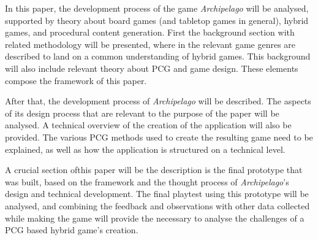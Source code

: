 
In this paper, the development process of the game \textit{Archipelago} will be analysed, supported by theory about board games (and tabletop games in general), hybrid games, and procedural content generation. First the background section with related methodology will be presented, where in the relevant game genres are described to land on a common understanding of hybrid games. This background will also include relevant theory about PCG and game design. These elements compose the framework of this paper.

After that, the development process of \textit{Archipelago} will be described. The aspects of its design process that are relevant to the purpose of the paper will be analysed. A technical overview of the creation of the application will also be provided. The various PCG methods used to create the resulting game need to be explained, as well as how the application is structured on a technical level. 

A crucial section ofthis paper will be the description is the final prototype that was built, based on the framework and the thought process of \textit{Archipelago}'s design and technical development. The final playtest using this prototype will be analysed, and combining the feedback and observations with other data collected while making the game will provide the necessary to analyse the challenges of a PCG based hybrid game's creation.

